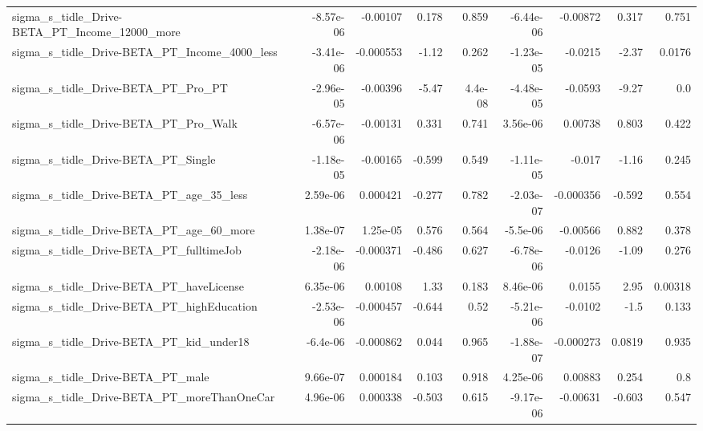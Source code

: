 \begin{tabular}{lrrrrrrrr}
sigma\_s\_tidle\_Drive-BETA\_PT\_Income\_12000\_more      &   -8.57e-06 &     -0.00107 &     0.178 &    0.859 &  -6.44e-06 &    -0.00872 &        0.317 &         0.751 \\
sigma\_s\_tidle\_Drive-BETA\_PT\_Income\_4000\_less       &   -3.41e-06 &    -0.000553 &     -1.12 &    0.262 &  -1.23e-05 &     -0.0215 &        -2.37 &        0.0176 \\
sigma\_s\_tidle\_Drive-BETA\_PT\_Pro\_PT                 &   -2.96e-05 &     -0.00396 &     -5.47 &  4.4e-08 &  -4.48e-05 &     -0.0593 &        -9.27 &           0.0 \\
sigma\_s\_tidle\_Drive-BETA\_PT\_Pro\_Walk               &   -6.57e-06 &     -0.00131 &     0.331 &    0.741 &   3.56e-06 &     0.00738 &        0.803 &         0.422 \\
sigma\_s\_tidle\_Drive-BETA\_PT\_Single                 &   -1.18e-05 &     -0.00165 &    -0.599 &    0.549 &  -1.11e-05 &      -0.017 &        -1.16 &         0.245 \\
sigma\_s\_tidle\_Drive-BETA\_PT\_age\_35\_less            &    2.59e-06 &     0.000421 &    -0.277 &    0.782 &  -2.03e-07 &   -0.000356 &       -0.592 &         0.554 \\
sigma\_s\_tidle\_Drive-BETA\_PT\_age\_60\_more            &    1.38e-07 &     1.25e-05 &     0.576 &    0.564 &   -5.5e-06 &    -0.00566 &        0.882 &         0.378 \\
sigma\_s\_tidle\_Drive-BETA\_PT\_fulltimeJob            &   -2.18e-06 &    -0.000371 &    -0.486 &    0.627 &  -6.78e-06 &     -0.0126 &        -1.09 &         0.276 \\
sigma\_s\_tidle\_Drive-BETA\_PT\_haveLicense            &    6.35e-06 &      0.00108 &      1.33 &    0.183 &   8.46e-06 &      0.0155 &         2.95 &       0.00318 \\
sigma\_s\_tidle\_Drive-BETA\_PT\_highEducation          &   -2.53e-06 &    -0.000457 &    -0.644 &     0.52 &  -5.21e-06 &     -0.0102 &         -1.5 &         0.133 \\
sigma\_s\_tidle\_Drive-BETA\_PT\_kid\_under18            &    -6.4e-06 &    -0.000862 &     0.044 &    0.965 &  -1.88e-07 &   -0.000273 &       0.0819 &         0.935 \\
sigma\_s\_tidle\_Drive-BETA\_PT\_male                   &    9.66e-07 &     0.000184 &     0.103 &    0.918 &   4.25e-06 &     0.00883 &        0.254 &           0.8 \\
sigma\_s\_tidle\_Drive-BETA\_PT\_moreThanOneCar         &    4.96e-06 &     0.000338 &    -0.503 &    0.615 &  -9.17e-06 &    -0.00631 &       -0.603 &         0.547 \\

\end{tabular}
